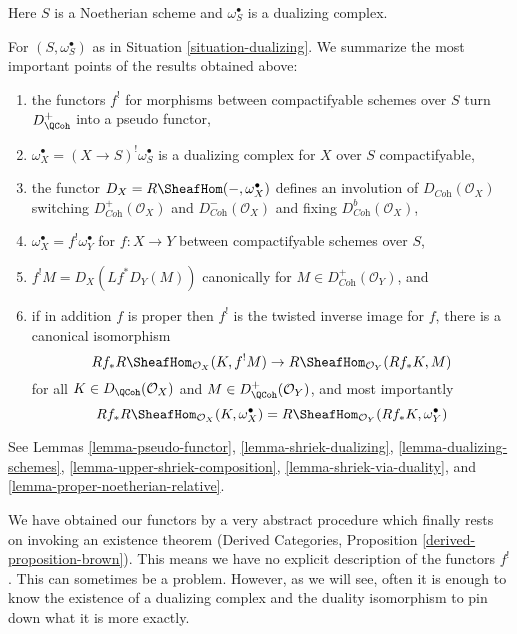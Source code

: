\begin{situation}
\label{situation-dualizing}
Here $S$ is a Noetherian scheme and $\omega_S^\bullet$ is a dualizing
complex.
\end{situation}

\noindent
For $(S, \omega_S^\bullet)$ as in Situation \ref{situation-dualizing}.
We summarize the most important points of the results obtained above:
\begin{enumerate}
\item the functors $f^!$ for morphisms between compactifyable
schemes over $S$ turn $D_\QCoh^+$ into a pseudo functor,
\item $\omega_X^\bullet = (X \to S)^!\omega_S^\bullet$
is a dualizing complex for $X$ over $S$ compactifyable,
\item the functor $D_X = R\SheafHom(-, \omega_X^\bullet)$
defines an involution of $D_{\textit{Coh}}(\mathcal{O}_X)$
switching $D_{\textit{Coh}}^+(\mathcal{O}_X)$ and
$D_{\textit{Coh}}^-(\mathcal{O}_X)$ and fixing
$D_{\textit{Coh}}^b(\mathcal{O}_X)$,
\item $\omega_X^\bullet = f^!\omega_Y^\bullet$ for $f : X \to Y$
between compactifyable schemes over $S$,
\item $f^!M = D_X(Lf^*D_Y(M))$ canonically for
$M \in D_{\textit{Coh}}^+(\mathcal{O}_Y)$, and
\item if in addition $f$ is proper then $f^!$ is the twisted
inverse image for $f$, there is a canonical isomorphism
$$
Rf_*R\SheafHom_{\mathcal{O}_X}(K, f^!M)
\to
R\SheafHom_{\mathcal{O}_Y}(Rf_*K, M)
$$
for all $K \in D_\QCoh(\mathcal{O}_X)$ and $M \in D_\QCoh^+(\mathcal{O}_Y)$,
and most importantly
$$
Rf_*R\SheafHom_{\mathcal{O}_X}(K, \omega_X^\bullet) =
R\SheafHom_{\mathcal{O}_Y}(Rf_*K, \omega_Y^\bullet)
$$
\end{enumerate}
See Lemmas
\ref{lemma-pseudo-functor},
\ref{lemma-shriek-dualizing},
\ref{lemma-dualizing-schemes},
\ref{lemma-upper-shriek-composition},
\ref{lemma-shriek-via-duality}, and
\ref{lemma-proper-noetherian-relative}. 

\medskip\noindent
We have obtained our functors by a very abstract procedure
which finally rests on invoking an existence theorem
(Derived Categories, Proposition \ref{derived-proposition-brown}).
This means we have no explicit description of the functors $f^!$.
This can sometimes be a problem. However, as we will see,
often it is enough to know the existence of a dualizing complex
and the duality isomorphism to pin down what it is more exactly.










